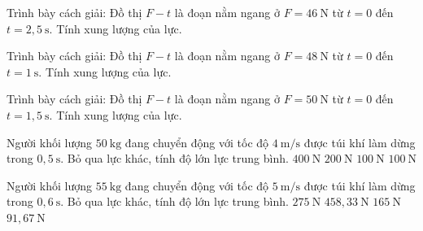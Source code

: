 \begin{bt}
Trình bày cách giải: Đồ thị $F-t$ là đoạn nằm ngang ở $F=46\ \mathrm{N}$ từ $t=0$ đến $t=2,5\ \mathrm{s}$. Tính xung lượng của lực.
\end{bt}

\begin{bt}
Trình bày cách giải: Đồ thị $F-t$ là đoạn nằm ngang ở $F=48\ \mathrm{N}$ từ $t=0$ đến $t=1\ \mathrm{s}$. Tính xung lượng của lực.
\end{bt}

\begin{bt}
Trình bày cách giải: Đồ thị $F-t$ là đoạn nằm ngang ở $F=50\ \mathrm{N}$ từ $t=0$ đến $t=1,5\ \mathrm{s}$. Tính xung lượng của lực.
\end{bt}

\begin{ex}
Người khối lượng $50\ \mathrm{kg}$ đang chuyển động với tốc độ $4\ \mathrm{m/s}$ được túi khí làm dừng trong $0,5\ \mathrm{s}$. Bỏ qua lực khác, tính độ lớn lực trung bình.
\choice
{\True $400\ \mathrm{N}$}
{$200\ \mathrm{N}$}
{$100\ \mathrm{N}$}
{$100\ \mathrm{N}$}
\end{ex}

\begin{ex}
Người khối lượng $55\ \mathrm{kg}$ đang chuyển động với tốc độ $5\ \mathrm{m/s}$ được túi khí làm dừng trong $0,6\ \mathrm{s}$. Bỏ qua lực khác, tính độ lớn lực trung bình.
\choice
{$275\ \mathrm{N}$}
{\True $458,33\ \mathrm{N}$}
{$165\ \mathrm{N}$}
{$91,67\ \mathrm{N}$}
\end{ex}

